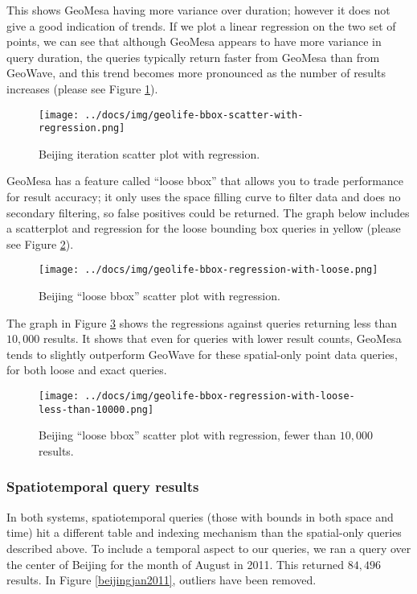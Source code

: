 This shows GeoMesa having more variance over duration; however it does not give a good indication of trends.
If we plot a linear regression on the two set of points, we can see that although GeoMesa appears to have
more variance in query duration, the queries typically return faster from GeoMesa than from GeoWave, and this
trend becomes more pronounced as the number of results increases (please see Figure \ref{beijingscatterreg}).

\begin{figure}[h!tb]
  \centering
  \texttt{[image: ../docs/img/geolife-bbox-scatter-with-regression.png]}
  \caption{Beijing iteration scatter plot with regression.}
  \label{beijingscatterreg}
\end{figure}

GeoMesa has a feature called ``loose bbox'' that allows you to trade performance for result accuracy;
it only uses the space filling curve to filter data and does no secondary filtering, so false positives
could be returned. The graph below includes a scatterplot and regression for the loose bounding box queries in yellow
(please see Figure \ref{beijingloosescatterreg}).

\begin{figure}[h!tb]
  \centering
  \texttt{[image: ../docs/img/geolife-bbox-regression-with-loose.png]}
  \caption{Beijing ``loose bbox'' scatter plot with regression.}
  \label{beijingloosescatterreg}
\end{figure}

The graph in Figure \ref{beijingloosescatterreg2} shows the regressions against queries returning less than $10,000$ results.
It shows that even for queries with lower result counts, GeoMesa tends to slightly outperform GeoWave
for these spatial-only point data queries, for both loose and exact queries.

\begin{figure}[h!tb]
  \centering
  \texttt{[image: ../docs/img/geolife-bbox-regression-with-loose-less-than-10000.png]}
  \caption{Beijing ``loose bbox'' scatter plot with regression, fewer than $10,000$ results.}
  \label{beijingloosescatterreg2}
\end{figure}

\subsubsection{Spatiotemporal query results}

In both systems, spatiotemporal queries (those with bounds in both space and time) hit a different table and indexing mechanism than the spatial-only queries described above.
To include a temporal aspect to our queries, we ran a query over the center of Beijing for the month of August in 2011.
This returned $84,496$ results.
In Figure \ref{beijingjan2011}, outliers have been removed.

